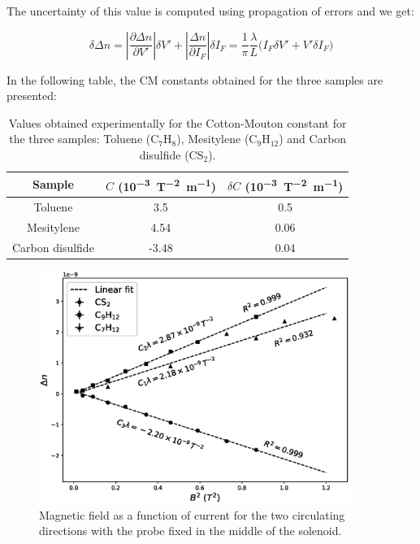 \documentclass[11pt,a4paper]{article}
\begin{document}
The uncertainty of this value is computed using propagation of errors and we get:

\begin{equation}\label{eq:d_delta_n}
\delta\Delta n=\left|\frac{\partial\Delta n}{\partial V'}\right|\delta V'+\left|\frac{\Delta n}{\partial I_F}\right|\delta I_F=\frac{1}{\pi}\frac{\lambda}{L}\big(I_F\delta V'+V'\delta I_F\big)
\end{equation}

In the following table, the CM constants obtained for the three samples are presented:

\begin{table}[H]
\centering
\begin{tabular}{ccc}
\toprule
Sample & $C$ (\si{10^{-3}.\tesla^{-2}.\m^{-1}}) & $\delta C$ (\si{10^{-3}.\tesla^{-2}.\m^{-1}})\\
\midrule
Toluene & 3.5 & 0.5 \\
Mesitylene & 4.54 & 0.06 \\
Carbon disulfide & -3.48 & 0.04 \\
\bottomrule
\end{tabular}
\caption{Values obtained experimentally for the Cotton-Mouton constant for the three samples: Toluene (C$_7$H$_8$), Mesitylene (C$_9$H$_{12}$) and Carbon disulfide (CS$_2$).}
\label{table:verdet}
\end{table}


\begin{figure}[H]
\centering
\includegraphics[width=0.9\textwidth]{CM_consts.eps}
\caption{Magnetic field as a function of current for the two circulating directions with the probe fixed in the middle of the solenoid.}
\label{fig:CM_const}
\end{figure}
\end{document}
